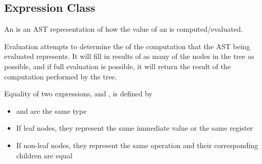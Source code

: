\subsection{Expression Class}
\label{sec:expression}

An  is an AST representation of how the value of an  is
computed/evaluated.

Evaluation attempts to determine the  of the
computation that the AST being evaluated represents. It will fill in results of
as many of the nodes in the tree as possible, and if full evaluation is
possible, it will return the result of the computation performed by the tree.

Equality of two expressions,  and , is defined by
\begin{itemize}
\item {} and  are the same type
\item If leaf nodes, they represent the same immediate value or the same register
\item If non-\/leaf nodes, they represent the same operation and their corresponding children are equal 
\end{itemize}

